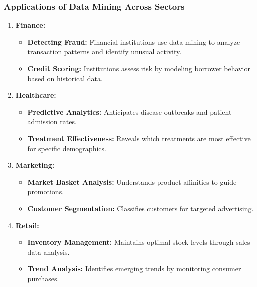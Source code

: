 \documentclass[aspectratio=169]{beamer}
\begin{document}
\begin{frame}[fragile]
    \frametitle{Applications of Data Mining Across Sectors}
    \begin{enumerate}
        \item \textbf{Finance:}
        \begin{itemize}
            \item \textbf{Detecting Fraud:} Financial institutions use data mining to analyze transaction patterns and identify unusual activity.
            \item \textbf{Credit Scoring:} Institutions assess risk by modeling borrower behavior based on historical data.
        \end{itemize}

        \item \textbf{Healthcare:}
        \begin{itemize}
            \item \textbf{Predictive Analytics:} Anticipates disease outbreaks and patient admission rates.
            \item \textbf{Treatment Effectiveness:} Reveals which treatments are most effective for specific demographics.
        \end{itemize}

        \item \textbf{Marketing:}
        \begin{itemize}
            \item \textbf{Market Basket Analysis:} Understands product affinities to guide promotions.
            \item \textbf{Customer Segmentation:} Classifies customers for targeted advertising.
        \end{itemize}

        \item \textbf{Retail:}
        \begin{itemize}
            \item \textbf{Inventory Management:} Maintains optimal stock levels through sales data analysis.
            \item \textbf{Trend Analysis:} Identifies emerging trends by monitoring consumer purchases.
        \end{itemize}
    \end{enumerate}
\end{frame}
\end{document}
